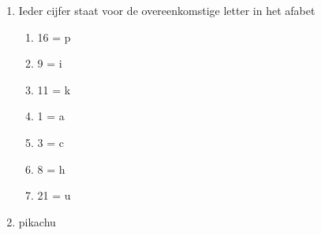 \begin{enumerate}
  \item Ieder cijfer staat voor de overeenkomstige letter in het afabet
  \begin{enumerate}
  \item 16 = p
  \item 9 = i
  \item 11 = k
  \item 1 = a
  \item 3 = c
  \item 8 = h
  \item 21 = u
  \end{enumerate}
  \item pikachu
\end{enumerate}